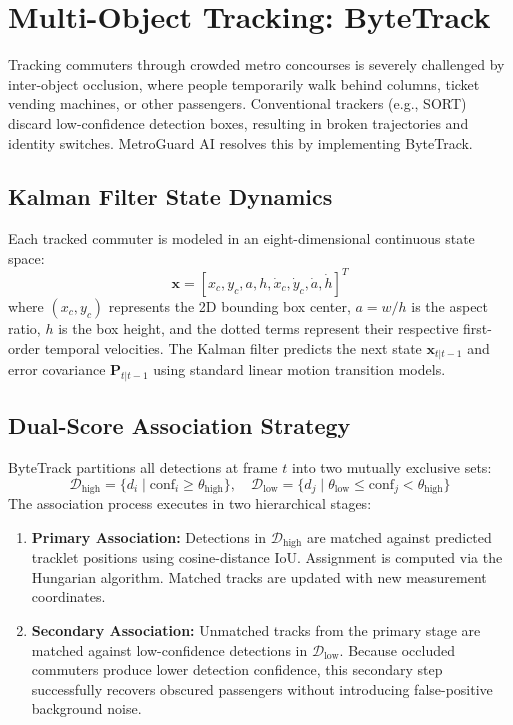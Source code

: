 \documentclass[12pt,a4paper]{report}
\begin{document}
\section{Multi-Object Tracking: ByteTrack}
Tracking commuters through crowded metro concourses is severely challenged by inter-object occlusion, where people temporarily walk behind columns, ticket vending machines, or other passengers. Conventional trackers (e.g., SORT) discard low-confidence detection boxes, resulting in broken trajectories and identity switches. MetroGuard AI resolves this by implementing ByteTrack.

\subsection{Kalman Filter State Dynamics}
Each tracked commuter is modeled in an eight-dimensional continuous state space:
\begin{equation}
    \mathbf{x} = \left[ x_c, y_c, a, h, \dot{x}_c, \dot{y}_c, \dot{a}, \dot{h} \right]^T
\end{equation}
where $(x_c, y_c)$ represents the 2D bounding box center, $a = w/h$ is the aspect ratio, $h$ is the box height, and the dotted terms represent their respective first-order temporal velocities. The Kalman filter predicts the next state $\mathbf{x}_{t|t-1}$ and error covariance $\mathbf{P}_{t|t-1}$ using standard linear motion transition models.

\subsection{Dual-Score Association Strategy}
ByteTrack partitions all detections at frame $t$ into two mutually exclusive sets:
\begin{equation}
    \mathcal{D}_{\text{high}} = \{ d_i \mid \text{conf}_i \ge \theta_{\text{high}} \}, \quad \mathcal{D}_{\text{low}} = \{ d_j \mid \theta_{\text{low}} \le \text{conf}_j < \theta_{\text{high}} \}
\end{equation}
The association process executes in two hierarchical stages:
\begin{enumerate}
    \item \textbf{Primary Association:} Detections in $\mathcal{D}_{\text{high}}$ are matched against predicted tracklet positions using cosine-distance IoU. Assignment is computed via the Hungarian algorithm. Matched tracks are updated with new measurement coordinates.
    \item \textbf{Secondary Association:} Unmatched tracks from the primary stage are matched against low-confidence detections in $\mathcal{D}_{\text{low}}$. Because occluded commuters produce lower detection confidence, this secondary step successfully recovers obscured passengers without introducing false-positive background noise.
\end{enumerate}
\end{document}
